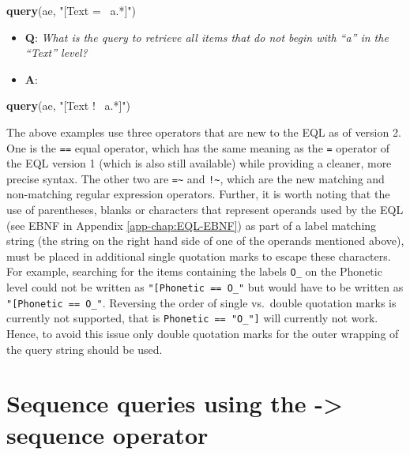 \documentclass[]{book}
\newenvironment{Shaded}{\begin{snugshade}}{\end{snugshade}}
\newcommand{\KeywordTok}[1]{\textcolor[rgb]{0.13,0.29,0.53}{\textbf{#1}}}
\newcommand{\NormalTok}[1]{#1}
\newcommand{\StringTok}[1]{\textcolor[rgb]{0.31,0.60,0.02}{#1}}
\providecommand{\tightlist}{%
  \setlength{\itemsep}{0pt}\setlength{\parskip}{0pt}}
\theoremstyle{definition}
\theoremstyle{definition}
\theoremstyle{definition}
\theoremstyle{remark}
\begin{document}
\begin{Shaded}
\begin{Highlighting}[]
\KeywordTok{query}\NormalTok{(ae, }\StringTok{"[Text =~ a.*]"}\NormalTok{)}
\end{Highlighting}
\end{Shaded}

\begin{itemize}
\tightlist
\item
  \textbf{Q}: \emph{What is the query to retrieve all items that do not
  begin with ``a'' in the ``Text'' level?}
\item
  \textbf{A}:
\end{itemize}

\begin{Shaded}
\begin{Highlighting}[]
\KeywordTok{query}\NormalTok{(ae, }\StringTok{"[Text !~ a.*]"}\NormalTok{)}
\end{Highlighting}
\end{Shaded}

The above examples use three operators that are new to the EQL as of
version 2. One is the \texttt{==} equal operator, which has the same
meaning as the \texttt{=} operator of the EQL version 1 (which is also
still available) while providing a cleaner, more precise syntax. The
other two are \texttt{=\textasciitilde{}} and
\texttt{!\textasciitilde{}}, which are the new matching and non-matching
regular expression operators. Further, it is worth noting that the use
of parentheses, blanks or characters that represent operands used by the
EQL (see EBNF in Appendix \ref{app-chap:EQL-EBNF}) as part of a label
matching string (the string on the right hand side of one of the
operands mentioned above), must be placed in additional single quotation
marks to escape these characters. For example, searching for the items
containing the labels \texttt{O\_\textquotesingle{}} on the Phonetic
level could not be written as
\texttt{"{[}Phonetic\ ==\ O\_\textquotesingle{}{]}"} but would have to
be written as
\texttt{"{[}Phonetic\ ==\ \textquotesingle{}O\_\textquotesingle{}\textquotesingle{}{]}"}.
Reversing the order of single vs.~double quotation marks is currently
not supported, that is
\texttt{\textquotesingle{}{[}Phonetic\ ==\ "O\_\textquotesingle{}"{]}\textquotesingle{}}
will currently not work. Hence, to avoid this issue only double
quotation marks for the outer wrapping of the query string should be
used.

\hypertarget{sequence-queries-using-the---sequence-operator}{%
\section{Sequence queries using the -\textgreater{} sequence
operator}\label{sequence-queries-using-the---sequence-operator}}
\end{document}
